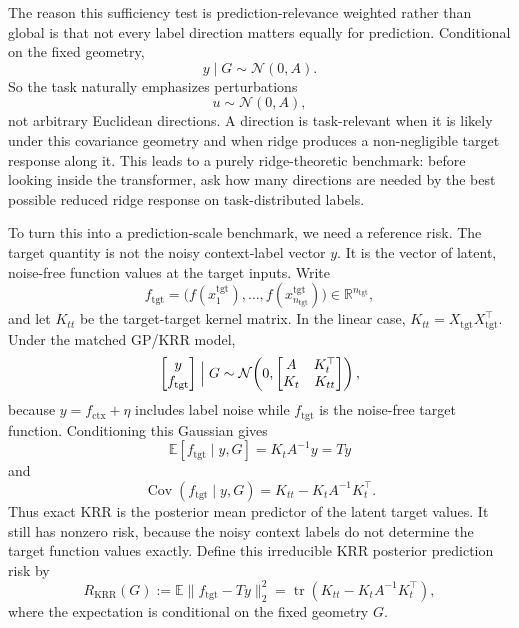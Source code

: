 \documentclass[11pt]{article}
\newcommand{\R}{\mathbb{R}}
\begin{document}
The reason this sufficiency test is prediction-relevance weighted rather than global is that not
every label direction matters equally for prediction. Conditional on the fixed geometry,
\[
y\mid G\sim\mathcal{N}(0,A).
\]
So the task naturally emphasizes perturbations
\[
u\sim\mathcal{N}(0,A),
\]
not arbitrary Euclidean directions. A direction is task-relevant when it is likely under this
covariance geometry and when ridge produces a non-negligible target response along it. This leads
to a purely ridge-theoretic benchmark: before looking inside the transformer, ask how many
directions are needed by the best possible reduced ridge response on task-distributed labels.

To turn this into a prediction-scale benchmark, we need a reference risk. The target quantity is not
the noisy context-label vector \(y\). It is the vector of latent, noise-free function values at the
target inputs. Write
\[
f_{\mathrm{tgt}}
=
\bigl(f(x^{\mathrm{tgt}}_1),\ldots,f(x^{\mathrm{tgt}}_{n_{\mathrm{tgt}}})\bigr)
\in\R^{n_{\mathrm{tgt}}},
\]
and let \(K_{tt}\) be the target-target kernel matrix. In the linear case,
\(K_{tt}=X_{\mathrm{tgt}}X_{\mathrm{tgt}}^\top\). Under the matched GP/KRR model,
\[
\begin{bmatrix}
y\\
f_{\mathrm{tgt}}
\end{bmatrix}
\Bigm|G
\sim
\mathcal{N}\!\left(
0,
\begin{bmatrix}
A & K_t^\top\\
K_t & K_{tt}
\end{bmatrix}
\right),
\]
because \(y=f_{\mathrm{ctx}}+\eta\) includes label noise while \(f_{\mathrm{tgt}}\) is the
noise-free target function. Conditioning this Gaussian gives
\[
\mathbb{E}[f_{\mathrm{tgt}}\mid y,G]=K_tA^{-1}y=Ty
\]
and
\[
\operatorname{Cov}(f_{\mathrm{tgt}}\mid y,G)
=
K_{tt}-K_tA^{-1}K_t^\top .
\]
Thus exact KRR is the posterior mean predictor of the latent target values. It still has nonzero
risk, because the noisy context labels do not determine the target function values exactly. Define
this irreducible KRR posterior prediction risk by
\[
R_{\mathrm{KRR}}(G)
:=
\mathbb{E}\|f_{\mathrm{tgt}}-Ty\|_2^2
=
\operatorname{tr}\!\left(K_{tt}-K_tA^{-1}K_t^\top\right),
\]
where the expectation is conditional on the fixed geometry \(G\).
\end{document}
